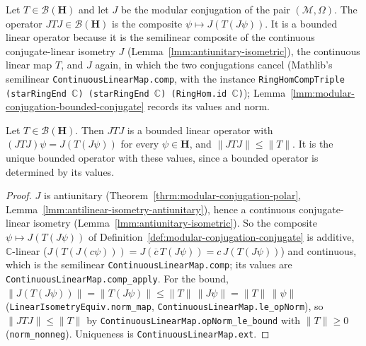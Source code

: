 \begin{definition}
    \label{def:modular-conjugation-conjugate}
    \leanok
    Let $T \in \mathcal{B}(\mathbf{H})$ and let $J$ be the modular conjugation of the pair $(\mathcal{M}, \Omega)$. The operator $JTJ \in \mathcal{B}(\mathbf{H})$ is the composite $\psi \mapsto J(T(J\psi))$. It is a bounded linear operator because it is the semilinear composite of the continuous conjugate-linear isometry $J$ (Lemma~\ref{lmm:antiunitary-isometric}), the continuous linear map $T$, and $J$ again, in which the two conjugations cancel (Mathlib's semilinear \texttt{ContinuousLinearMap.comp}, with the instance \texttt{RingHomCompTriple (starRingEnd \ensuremath{\mathbb{C}}) (starRingEnd \ensuremath{\mathbb{C}}) (RingHom.id \ensuremath{\mathbb{C}})}); Lemma~\ref{lmm:modular-conjugation-bounded-conjugate} records its values and norm.
\end{definition}

\begin{lemma}
    \label{lmm:modular-conjugation-bounded-conjugate}
    \leanok
    Let $T \in \mathcal{B}(\mathbf{H})$. Then $JTJ$ is a bounded linear operator with $(JTJ)\psi = J(T(J\psi))$ for every $\psi \in \mathbf{H}$, and $\|JTJ\| \le \|T\|$. It is the unique bounded operator with these values, since a bounded operator is determined by its values.
\end{lemma}
\begin{proof}
    \leanok
    $J$ is antiunitary (Theorem~\ref{thrm:modular-conjugation-polar}, Lemma~\ref{lmm:antilinear-isometry-antiunitary}), hence a continuous conjugate-linear isometry (Lemma~\ref{lmm:antiunitary-isometric}). So the composite $\psi \mapsto J(T(J\psi))$ of Definition~\ref{def:modular-conjugation-conjugate} is additive, $\mathbb{C}$-linear ($J(T(J(c\psi))) = J(\overline{c}\,T(J\psi)) = c\,J(T(J\psi))$) and continuous, which is the semilinear \texttt{ContinuousLinearMap.comp}; its values are \texttt{ContinuousLinearMap.comp\_apply}. For the bound, $\|J(T(J\psi))\| = \|T(J\psi)\| \le \|T\|\,\|J\psi\| = \|T\|\,\|\psi\|$ (\texttt{LinearIsometryEquiv.norm\_map}, \texttt{ContinuousLinearMap.le\_opNorm}), so $\|JTJ\| \le \|T\|$ by \texttt{ContinuousLinearMap.opNorm\_le\_bound} with $\|T\| \ge 0$ (\texttt{norm\_nonneg}). Uniqueness is \texttt{ContinuousLinearMap.ext}.
\end{proof}


